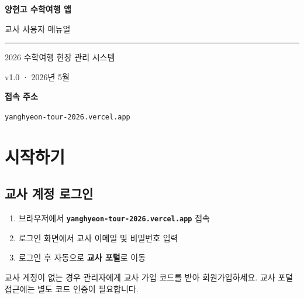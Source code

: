 \documentclass[a4paper,11pt]{article}
\begin{document}
\begin{titlepage}
  \centering
  \vspace*{3cm}
  {\Huge\bfseries\color{primary} 양현고 수학여행 앱}\par\vspace{0.5cm}
  {\LARGE 교사 사용자 매뉴얼}\par\vspace{1cm}
  \textcolor{gray}{\rule{8cm}{0.5pt}}\par\vspace{1cm}
  {\large 2026 수학여행 현장 관리 시스템}\par\vspace{0.5cm}
  {\normalsize\color{gray} v1.0 · 2026년 5월}\par
  \vfill
  \begin{tcolorbox}[colback=lightblue, colframe=primary, arc=6pt,
    boxrule=1pt, width=10cm]
    \centering
    \textbf{접속 주소}\par\vspace{0.3em}
    {\large\color{primary}\texttt{yanghyeon-tour-2026.vercel.app}}
  \end{tcolorbox}
\end{titlepage}

\tableofcontents
\newpage

\section{시작하기}

\subsection{교사 계정 로그인}

\begin{enumerate}
  \item 브라우저에서 \textbf{\texttt{yanghyeon-tour-2026.vercel.app}} 접속
  \item 로그인 화면에서 교사 이메일 및 비밀번호 입력
  \item 로그인 후 자동으로 \textbf{교사 포털}로 이동
\end{enumerate}

\begin{tcolorbox}[tipbox]
교사 계정이 없는 경우 관리자에게 교사 가입 코드를 받아 회원가입하세요. 교사 포털 접근에는 별도 코드 인증이 필요합니다.
\end{tcolorbox}
\end{document}
